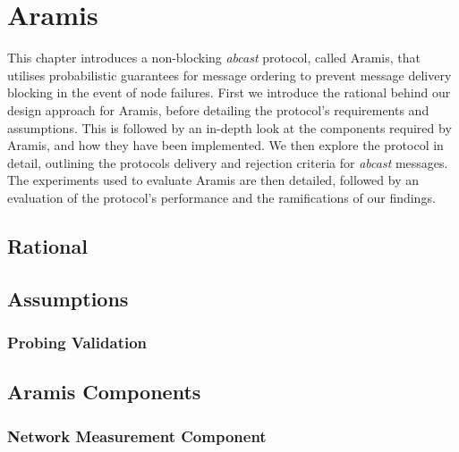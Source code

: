 \chapter{Aramis}

    \graphicspath{{Chapter4/Figs/Vector/}{Chapter4/Figs/}}

This chapter introduces a non-blocking \emph{abcast} protocol, called \textsf{Aramis}, that utilises probabilistic guarantees for message ordering to prevent message delivery blocking in the event of node failures.  First we introduce the rational behind our design approach for \textsf{Aramis}, before detailing the protocol's requirements and assumptions.  This is followed by an in-depth look at the components required by \textsf{Aramis}, and how they have been implemented.  We then explore the protocol in detail, outlining the protocols delivery and rejection criteria for \emph{abcast} messages.  The experiments used to evaluate \textsf{Aramis} are then detailed, followed by an evaluation of the protocol's performance and the ramifications of our findings.  

\section{Rational}
	
\section{Assumptions}

	\subsection{Probing Validation}
	
\section{Aramis Components}
	\subsection{Network Measurement Component}
